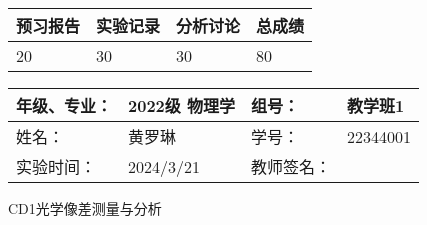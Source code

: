 \documentclass[dvipsnames, svgnames,a4paper,11pt]{article}
\begin{document}
	
	\begin{table}
		\renewcommand\arraystretch{1.7}
		\begin{tabularx}{\textwidth}{
				|X|X|X|X
				|X|X|X|X|}
			\hline
			\multicolumn{2}{|c|}{预习报告}&\multicolumn{2}{|c|}{实验记录}&\multicolumn{2}{|c|}{分析讨论}&\multicolumn{2}{|c|}{总成绩}\\
			\hline
			\LARGE20 & & \LARGE30 & & \LARGE30 & & \LARGE80 & \\
			\hline
		\end{tabularx}
	\end{table}
	
	\begin{table}
		\renewcommand\arraystretch{1.7}
		\begin{tabularx}{\textwidth}{|X|X|X|X|}
			\hline
			年级、专业： & 2022级 物理学 &组号： & 教学班1\\
			\hline
			姓名： & 黄罗琳   & 学号： &22344001   \\
			\hline
			实验时间： & 2024/3/21 & 教师签名： & \\
			\hline
		\end{tabularx}
	\end{table}
	
	\begin{center}
		\LARGE CD1\quad 光学像差测量与分析
	\end{center}
	
	
\end{document}
